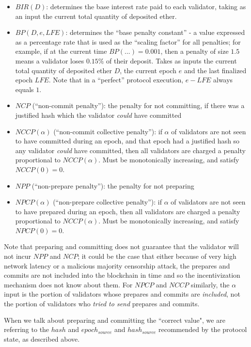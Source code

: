 \documentclass[12pt]{article}
\begin{document}
\begin{itemize}
\item $BIR(D)$: determines the base interest rate paid to each validator, taking as an input the current total quantity of deposited ether.
\item $BP(D, e, LFE)$: determines the ``base penalty constant'' - a value expressed as a percentage rate that is used as the ``scaling factor'' for all penalties; for example, if at the current time $BP(...) = 0.001$, then a penalty of size $1.5$ means a validator loses $0.15\%$ of their deposit. Takes as inputs the current total quantity of deposited ether $D$, the current epoch $e$ and the last finalized epoch $LFE$. Note that in a ``perfect'' protocol execution, $e - LFE$ always equals $1$.
\item $NCP$ (``non-commit penalty''): the penalty for not committing, if there was a justified hash which the validator \textit{could} have committed
\item $NCCP(\alpha)$ (``non-commit collective penalty''): if $\alpha$ of validators are not seen to have committed during an epoch, and that epoch had a justified hash so any validator \textit{could} have committed, then all validators are charged a penalty proportional to $NCCP(\alpha)$. Must be monotonically increasing, and satisfy $NCCP(0) = 0$.
\item $NPP$ (``non-prepare penalty''): the penalty for not preparing
\item $NPCP(\alpha)$ (``non-prepare collective penalty''): if $\alpha$ of validators are not seen to have prepared during an epoch, then all validators are charged a penalty proportional to $NCCP(\alpha)$. Must be monotonically increasing, and satisfy $NPCP(0) = 0$.
\end{itemize}

Note that preparing and committing does not guarantee that the validator will not incur $NPP$ and $NCP$; it could be the case that either because of very high network latency or a malicious majority censorship attack, the prepares and commits are not included into the blockchain in time and so the incentivization mechanism does not know about them. For $NPCP$ and $NCCP$ similarly, the $\alpha$ input is the portion of validators whose prepares and commits are \textit{included}, not the portion of validators who \textit{tried to send} prepares and commits. 

When we talk about preparing and committing the ``correct value", we are referring to the $hash$ and $epoch_{source}$ and $hash_{source}$ recommended by the protocol state, as described above.
\end{document}
